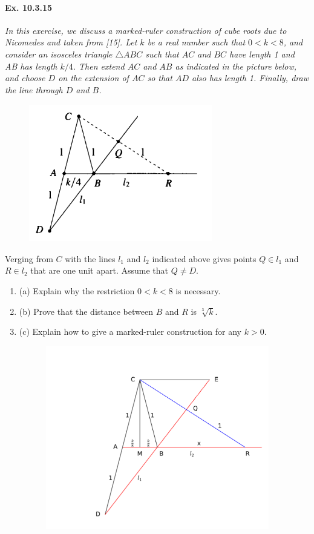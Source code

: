 \documentclass[11pt,a4paper]{article}
\newcommand{\be} {\begin{enumerate}}
\newcommand{\ee} {\end{enumerate}}
\begin{document}
\paragraph{Ex. 10.3.15}

{\it In this exercise, we discuss a marked-ruler construction of cube roots due to Nicomedes and taken from [15]. Let $k$ be a real number such that $0<k<8$, and consider an isosceles triangle $\triangle ABC$ such that $AC$ and $BC$ have length 1 and AB has length $k/4$. Then extend $AC$ and $AB$ as indicated in the picture below, and choose $D$ on the extension of $AC$ so that $AD$ also has length 1. Finally, draw the line through $D$ and $B$.

\begin{figure}[htbp]
\begin{center}
\includegraphics [width=8cm,height=6cm] {Ex.10.3.15.png}
\end{center}
\end{figure}

Verging from $C$ with the lines $l_1$ and $l_2$ indicated above gives points $Q\in l_1$ and $R \in l_2$ that are one unit apart. Assume that $Q\ne D$.
\be
\item[(a)] Explain why the restriction $0<k<8$ is necessary.
\item[(b)] Prove that the distance between $B$ and $R$ is $\sqrt[3]{k}$.
\item[(c)] Explain how to give a marked-ruler construction for any $k>0$.
\ee
}

\begin{figure}[htbp]
\begin{center}
\includegraphics[width=12cm,height=8cm]{Nicomedes.pdf}
\end{center}
\end{figure}
\end{document}
